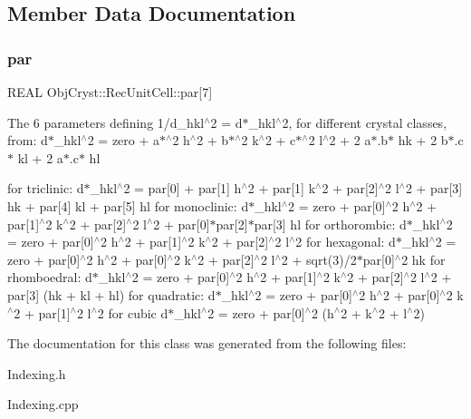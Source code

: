 \subsection{Member Data Documentation}
\mbox{\label{class_obj_cryst_1_1_rec_unit_cell_a624fa31d8c012440df7a3d7637dae182}} 
\subsubsection{\texorpdfstring{par}{par}}
{\footnotesize\ttfamily R\+E\+AL Obj\+Cryst\+::\+Rec\+Unit\+Cell\+::par\mbox{[}7\mbox{]}}

The 6 parameters defining 1/d\+\_\+hkl$^\wedge$2 = d$\ast$\+\_\+hkl$^\wedge$2, for different crystal classes, from\+: d$\ast$\+\_\+hkl$^\wedge$2 = zero + a$\ast$$^\wedge$2 h$^\wedge$2 + b$\ast$$^\wedge$2 k$^\wedge$2 + c$\ast$$^\wedge$2 l$^\wedge$2 + 2 a$\ast$.b$\ast$ hk + 2 b$\ast$.c$\ast$ kl + 2 a$\ast$.c$\ast$ hl

for triclinic\+: d$\ast$\+\_\+hkl$^\wedge$2 = par\mbox{[}0\mbox{]} + par\mbox{[}1\mbox{]} h$^\wedge$2 + par\mbox{[}1\mbox{]} k$^\wedge$2 + par\mbox{[}2\mbox{]}$^\wedge$2 l$^\wedge$2 + par\mbox{[}3\mbox{]} hk + par\mbox{[}4\mbox{]} kl + par\mbox{[}5\mbox{]} hl for monoclinic\+: d$\ast$\+\_\+hkl$^\wedge$2 = zero + par\mbox{[}0\mbox{]}$^\wedge$2 h$^\wedge$2 + par\mbox{[}1\mbox{]}$^\wedge$2 k$^\wedge$2 + par\mbox{[}2\mbox{]}$^\wedge$2 l$^\wedge$2 + par\mbox{[}0\mbox{]}$\ast$par\mbox{[}2\mbox{]}$\ast$par\mbox{[}3\mbox{]} hl for orthorombic\+: d$\ast$\+\_\+hkl$^\wedge$2 = zero + par\mbox{[}0\mbox{]}$^\wedge$2 h$^\wedge$2 + par\mbox{[}1\mbox{]}$^\wedge$2 k$^\wedge$2 + par\mbox{[}2\mbox{]}$^\wedge$2 l$^\wedge$2 for hexagonal\+: d$\ast$\+\_\+hkl$^\wedge$2 = zero + par\mbox{[}0\mbox{]}$^\wedge$2 h$^\wedge$2 + par\mbox{[}0\mbox{]}$^\wedge$2 k$^\wedge$2 + par\mbox{[}2\mbox{]}$^\wedge$2 l$^\wedge$2 + sqrt(3)/2$\ast$par\mbox{[}0\mbox{]}$^\wedge$2 hk for rhomboedral\+: d$\ast$\+\_\+hkl$^\wedge$2 = zero + par\mbox{[}0\mbox{]}$^\wedge$2 h$^\wedge$2 + par\mbox{[}1\mbox{]}$^\wedge$2 k$^\wedge$2 + par\mbox{[}2\mbox{]}$^\wedge$2 l$^\wedge$2 + par\mbox{[}3\mbox{]} (hk + kl + hl) for quadratic\+: d$\ast$\+\_\+hkl$^\wedge$2 = zero + par\mbox{[}0\mbox{]}$^\wedge$2 h$^\wedge$2 + par\mbox{[}0\mbox{]}$^\wedge$2 k$^\wedge$2 + par\mbox{[}1\mbox{]}$^\wedge$2 l$^\wedge$2 for cubic d$\ast$\+\_\+hkl$^\wedge$2 = zero + par\mbox{[}0\mbox{]}$^\wedge$2 (h$^\wedge$2 + k$^\wedge$2 + l$^\wedge$2) 

The documentation for this class was generated from the following files\+:\begin{DoxyCompactItemize}
\item 
Indexing.\+h\item 
Indexing.\+cpp\end{DoxyCompactItemize}
